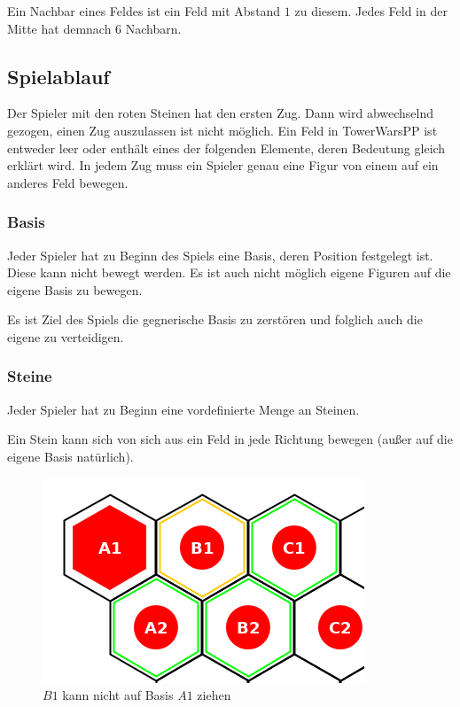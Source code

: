 Ein Nachbar eines Feldes ist ein Feld mit Abstand $1$ zu diesem. Jedes Feld in der Mitte hat demnach $6$ Nachbarn.

\subsection*{Spielablauf}
Der Spieler mit den roten Steinen hat den ersten Zug. Dann wird abwechselnd gezogen, einen Zug auszulassen ist nicht möglich. Ein Feld in TowerWarsPP ist entweder leer oder enthält eines der folgenden Elemente, deren Bedeutung gleich erklärt wird. In jedem Zug muss ein Spieler genau eine Figur von einem auf ein anderes Feld bewegen.

\subsubsection*{Basis}
Jeder Spieler hat zu Beginn des Spiels eine Basis, deren Position festgelegt ist. Diese kann nicht bewegt werden. Es ist auch nicht möglich eigene Figuren auf die eigene Basis zu bewegen.

Es ist Ziel des Spiels die gegnerische Basis zu zerstören und folglich auch die eigene zu verteidigen.

\subsubsection*{Steine}
Jeder Spieler hat zu Beginn eine vordefinierte Menge an Steinen. 

Ein Stein kann sich von sich aus ein Feld in jede Richtung bewegen (außer auf die eigene Basis natürlich).
\begin{figure}[ht]
\begin{center}
\includegraphics[scale=0.3]{graphic/token-nobase.png}
\end{center}
\caption*{$B1$ kann nicht auf Basis $A1$ ziehen}
\end{figure}

